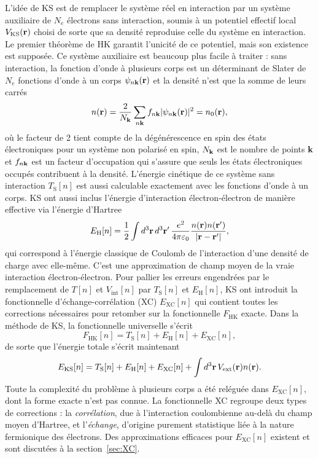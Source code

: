 L'idée de KS est de remplacer le système réel en interaction par un système auxiliaire de $N_e$ électrons sans interaction, soumis à un potentiel effectif local $V_\text{KS}(\mathbf{r})$ choisi de sorte que sa densité reproduise celle du système en interaction. Le premier théorème de HK garantit l'unicité de ce potentiel, mais son existence est supposée. Ce système auxiliaire est beaucoup plus facile à traiter : sans interaction, la fonction d'onde à plusieurs corps est un déterminant de Slater de $N_e$ fonctions d'onde à un corps $\psi_{n\mathbf{k}}(\mathbf{r})$ et la densité n'est que la somme de leurs carrés
\begin{equation}
    \label{eqn:c2_nKS}
    n(\mathbf{r}) = \frac{2}{N_{\mathbf{k}}}\sum_{n\mathbf{k}} f_{n\mathbf{k}}|\psi_{n\mathbf{k}}(\mathbf{r})|^2=n_0(\mathbf{r}),
\end{equation}
où le facteur de 2 tient compte de la dégénérescence en spin des états électroniques pour un système non polarisé en spin, $N_{\mathbf{k}}$ est le nombre de points $\mathbf{k}$ et $f_{n\mathbf{k}}$ est un facteur d'occupation qui s'assure que seuls les états électroniques occupés contribuent à la densité. L'énergie cinétique de ce système sans interaction $T_\text{S}[n]$ est aussi calculable exactement avec les fonctions d'onde à un corps. KS ont aussi inclus l'énergie d'interaction électron-électron de manière effective via l'énergie d'Hartree~\cite{hartreeWaveMechanicsAtom1928,hartreeWaveMechanicsAtom1928a,fockNaeherungsmethodeZurLoesung1930}
\begin{equation}
    \label{eqn:c2_EH}
    E_\text{H}[n]=\frac{1}{2}\int d^3\mathbf{r}\,d^3\mathbf{r}'\,\frac{e^2}{4\pi\varepsilon_0}\frac{n(\mathbf{r})n(\mathbf{r}')}{|\mathbf{r}-\mathbf{r}'|},
\end{equation}
qui correspond à l'énergie classique de Coulomb de
l'interaction d'une densité de charge avec elle-même. C'est une
approximation de champ moyen de la vraie interaction électron-électron. Pour pallier les erreurs engendrées par le remplacement de $T[n]$ et $V_\text{int}[n]$ par $T_\text{S}[n]$ et $E_\text{H}[n]$, KS ont introduit la fonctionnelle d'échange-corrélation (XC) $E_\text{XC}[n]$ qui contient toutes les corrections nécessaires pour retomber sur la fonctionnelle $F_\text{HK}$ exacte. Dans la méthode de KS, la fonctionnelle universelle s'écrit
\begin{equation}
    \label{eqn:c2_FHK_KS}
    F_\text{HK}[n]=T_\text{S}[n]+E_\text{H}[n]+E_\text{XC}[n],
\end{equation}
de sorte que l'énergie totale s'écrit maintenant
\begin{equation}
    \label{eqn:c2_EKS}
    E_\text{KS}[n]=T_\text{S}[n]+E_\text{H}[n]+E_\text{XC}[n]+\int d^3\mathbf{r}\,V_\text{ext}(\mathbf{r})n(\mathbf{r}).
\end{equation}
Toute la complexité du problème à plusieurs corps a été reléguée dans $E_\text{XC}[n]$, dont la forme exacte n'est pas connue. La fonctionnelle XC regroupe deux types de corrections : la \textit{corrélation}, due à l'interaction coulombienne au-delà du champ moyen d'Hartree, et l'\textit{échange}, d'origine purement statistique liée à la nature fermionique des électrons. Des approximations efficaces pour $E_\text{XC}[n]$ existent et sont discutées à la section~\ref{sec:XC}.

